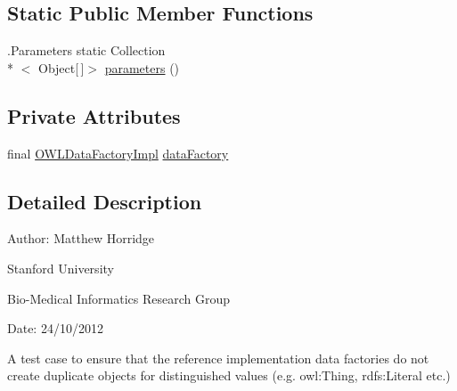 \subsection*{Static Public Member Functions}
\begin{DoxyCompactItemize}
\item 
.Parameters static Collection\\*
$<$ Object\mbox{[}$\,$\mbox{]}$>$ \hyperlink{classorg_1_1semanticweb_1_1owlapi_1_1api_1_1test_1_1_o_w_l_data_factory_impl_test_case_a8dcd73e8d09cf69c367f30116784d383}{parameters} ()
\end{DoxyCompactItemize}
\subsection*{Private Attributes}
\begin{DoxyCompactItemize}
\item 
final \hyperlink{classuk_1_1ac_1_1manchester_1_1cs_1_1owl_1_1owlapi_1_1_o_w_l_data_factory_impl}{O\-W\-L\-Data\-Factory\-Impl} \hyperlink{classorg_1_1semanticweb_1_1owlapi_1_1api_1_1test_1_1_o_w_l_data_factory_impl_test_case_a8b5ffc5ba7c8e73e8628919047210c13}{data\-Factory}
\end{DoxyCompactItemize}


\subsection{Detailed Description}
Author\-: Matthew Horridge\par
 Stanford University\par
 Bio-\/\-Medical Informatics Research Group\par
 Date\-: 24/10/2012 

A test case to ensure that the reference implementation data factories do not create duplicate objects for distinguished values (e.\-g. owl\-:Thing, rdfs\-:Literal etc.) 

